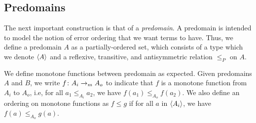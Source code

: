 \begin{comment}
The lift monad has the following universal property. Let $f$ be a function from $A$ to $B$,
where $B$ is a $\later$-algebra, i.e., there is $\theta_B \colon \later B \to B$.
Further suppose that $B$ is also an ``error-algebra'', that is, there is an error element
$\mho_B$ such that $\mho_B \le_B y$ for all $y \in B$.


Then there is a unique homomorphism of algebras $f' \colon \li A \to B$ such that
$f' \circ \eta = f$. The function $f'(l)$ is defined via guarded fixpoint by cases on $l$. 
In the $\mho$ case, we simply return $\mho_B$.
In the $\theta(\tilde{l})$ case, we will return

\[\theta_B (\lambda t . (f'_t \, \tilde{l}_t)). \]

Recalling that $f'$ is a guarded fixpoint, it is available ``later'' and by
applying the tick we get a function we can apply ``now''; for the argument,
we apply the tick to $\tilde{l}$ to get a term of type $\li A$.
\end{comment}



\subsection{Predomains}\label{sec:predomains}

The next important construction is that of a \emph{predomain}. A predomain is intended to
model the notion of error ordering that we want terms to have. Thus, we define a predomain $A$
as a partially-ordered set, which consists of a type which we denote $\langle {A} \rangle$ and a reflexive,
transitive, and antisymmetric relation $\le_P$ on $A$.

We define monotone functions between predomain as expected. Given predomains
$A$ and $B$, we write $f \colon A_i \to_m A_o$ to indicate that $f$ is a monotone
function from $A_i$ to $A_o$, i.e, for all $a_1 \le_{A_i} a_2$, we have $f(a_1) \le_{A_o} f(a_2)$.
We also define an ordering on monotone functions as
$f \le g$ if for all $a$ in $\langle {A_i} \rangle$, we have $f(a) \le_{A_o} g(a)$.

